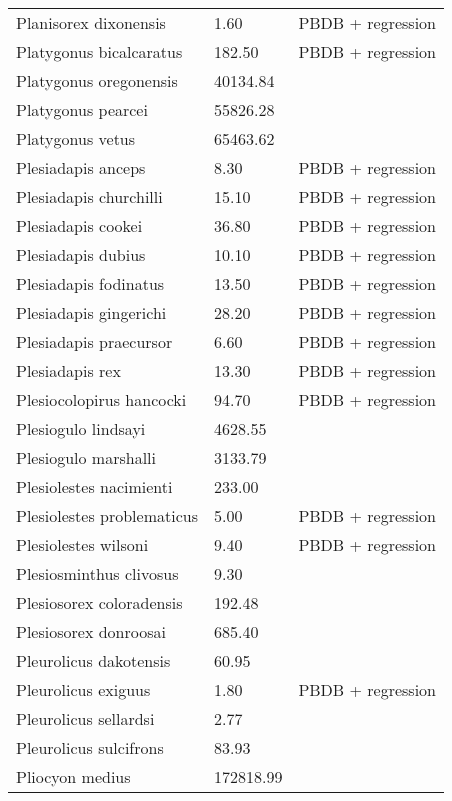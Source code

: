 \documentclass{article}
\begin{document}
\begin{center}
\begin{longtable}{p{} p{} p{}}
    Planisorex dixonensis & 1.60 & PBDB + regression \\ 
    Platygonus bicalcaratus & 182.50 & PBDB + regression \\ 
    Platygonus oregonensis & 40134.84 & \cite{Tomiya2013} \\ 
    Platygonus pearcei & 55826.28 & \cite{Tomiya2013} \\ 
    Platygonus vetus & 65463.62 & \cite{Brook2004a} \\ 
    Plesiadapis anceps & 8.30 & PBDB + regression \\ 
    Plesiadapis churchilli & 15.10 & PBDB + regression \\ 
    Plesiadapis cookei & 36.80 & PBDB + regression \\ 
    Plesiadapis dubius & 10.10 & PBDB + regression \\ 
    Plesiadapis fodinatus & 13.50 & PBDB + regression \\ 
    Plesiadapis gingerichi & 28.20 & PBDB + regression \\ 
    Plesiadapis praecursor & 6.60 & PBDB + regression \\ 
    Plesiadapis rex & 13.30 & PBDB + regression \\ 
    Plesiocolopirus hancocki & 94.70 & PBDB + regression \\ 
    Plesiogulo lindsayi & 4628.55 & \cite{Tomiya2013} \\ 
    Plesiogulo marshalli & 3133.79 & \cite{Tomiya2013} \\ 
    Plesiolestes nacimienti & 233.00 & \cite{Soligo2006} \\ 
    Plesiolestes problematicus & 5.00 & PBDB + regression \\ 
    Plesiolestes wilsoni & 9.40 & PBDB + regression \\ 
    Plesiosminthus clivosus & 9.30 & \cite{Tomiya2013} \\ 
    Plesiosorex coloradensis & 192.48 & \cite{Tomiya2013} \\ 
    Plesiosorex donroosai & 685.40 & \cite{Tomiya2013} \\ 
    Pleurolicus dakotensis & 60.95 & \cite{Tomiya2013} \\ 
    Pleurolicus exiguus & 1.80 & PBDB + regression \\ 
    Pleurolicus sellardsi & 2.77 & \cite{Zakrzewski1991a} \\ 
    Pleurolicus sulcifrons & 83.93 & \cite{Tomiya2013} \\ 
    Pliocyon medius & 172818.99 & \cite{Tomiya2013} \\ 

\end{longtable}
\end{center}
\end{document}

